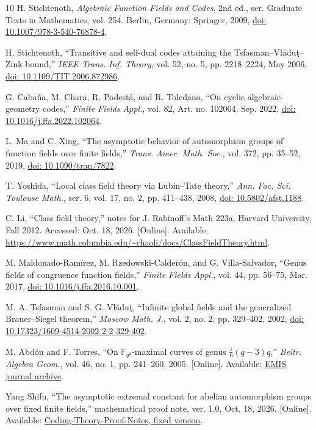 \documentclass[12pt,onecolumn,draftclsnofoot,letterpaper]{IEEEtran}
\theoremstyle{remark}
\newcommand{\F}{\mathbb F}
\newcommand{\doi}[1]{\href{https://doi.org/#1}{doi: #1}}
\begin{document}
\begin{thebibliography}{10}
H. Stichtenoth, \emph{Algebraic Function Fields and Codes}, 2nd ed., ser. Graduate Texts in Mathematics, vol. 254. Berlin, Germany: Springer, 2009, \doi{10.1007/978-3-540-76878-4}.

H. Stichtenoth, ``Transitive and self-dual codes attaining the Tsfasman--Vl\u{a}du\c{t}--Zink bound,'' \emph{IEEE Trans. Inf. Theory}, vol. 52, no. 5, pp. 2218--2224, May 2006, \doi{10.1109/TIT.2006.872986}.

G. Caba\~na, M. Chara, R. Podest\'a, and R. Toledano, ``On cyclic algebraic-geometry codes,'' \emph{Finite Fields Appl.}, vol. 82, Art. no. 102064, Sep. 2022, \doi{10.1016/j.ffa.2022.102064}.

L. Ma and C. Xing, ``The asymptotic behavior of automorphism groups of function fields over finite fields,'' \emph{Trans. Amer. Math. Soc.}, vol. 372, pp. 35--52, 2019, \doi{10.1090/tran/7822}.

T. Yoshida, ``Local class field theory via Lubin--Tate theory,'' \emph{Ann. Fac. Sci. Toulouse Math.}, ser. 6, vol. 17, no. 2, pp. 411--438, 2008, \doi{10.5802/afst.1188}.

C. Li, ``Class field theory,'' notes for J. Rabinoff's Math 223a, Harvard University, Fall 2012. Accessed: Oct. 18, 2026. [Online]. Available: \url{https://www.math.columbia.edu/~chaoli/docs/ClassFieldTheory.html}.

M. Maldonado-Ram\'irez, M. Rzedowski-Calder\'on, and G. Villa-Salvador, ``Genus fields of congruence function fields,'' \emph{Finite Fields Appl.}, vol. 44, pp. 56--75, Mar. 2017, \doi{10.1016/j.ffa.2016.10.001}.

M. A. Tsfasman and S. G. Vl\u{a}du\c{t}, ``Infinite global fields and the generalized Brauer--Siegel theorem,'' \emph{Moscow Math. J.}, vol. 2, no. 2, pp. 329--402, 2002, \doi{10.17323/1609-4514-2002-2-2-329-402}.

M. Abd\'on and F. Torres, ``On $\F_{q^2}$-maximal curves of genus $\tfrac16(q-3)q$,'' \emph{Beitr. Algebra Geom.}, vol. 46, no. 1, pp. 241--260, 2005. [Online]. Available: \href{https://www.kurims.kyoto-u.ac.jp/EMIS/journals/BAG/vol.46/no.1/b46h1tor.pdf}{EMIS journal archive}.

Yang Shifu, ``The asymptotic extremal constant for abelian automorphism groups over fixed finite fields,'' mathematical proof note, ver. 1.0, Oct. 18, 2026. [Online]. Available: \href{https://github.com/stalin1943/Coding-Theory-Proof-Notes/blob/main/abelian-automorphism-constant-two/proof.pdf}{Coding-Theory-Proof-Notes, fixed version}.
\end{thebibliography}
\end{document}
